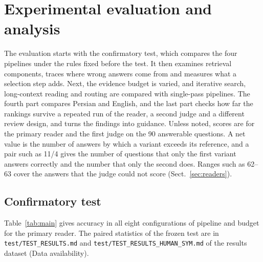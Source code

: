\section{Experimental evaluation and analysis}
\label{sec:results}

The evaluation starts with the confirmatory test, which compares the four pipelines under the rules fixed before the test. It then examines retrieval components, traces where wrong answers come from and measures what a selection step adds. Next, the evidence budget is varied, and iterative search, long-context reading and routing are compared with single-pass pipelines. The fourth part compares Persian and English, and the last part checks how far the rankings survive a repeated run of the reader, a second judge and a different review design, and turns the findings into guidance. Unless noted, scores are for the primary reader and the first judge on the 90 answerable questions. A net value is the number of answers by which a variant exceeds its reference, and a pair such as 11/4 gives the number of questions that only the first variant answers correctly and the number that only the second does. Ranges such as 62--63 cover the answers that the judge could not score (Sect.~\ref{sec:readers}).

\subsection{Confirmatory test}
\label{sec:frozen}
Table~\ref{tab:main} gives accuracy in all eight configurations of pipeline and budget for the primary reader. The paired statistics of the frozen test are in \texttt{test/TEST\_RESULTS.md} and \texttt{test/TEST\_RESULTS\_HUMAN\_SYM.md} of the results dataset (Data availability).


